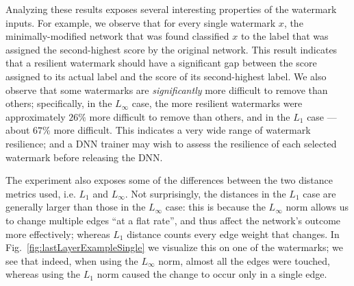 \documentclass{easychair}
\begin{document}
Analyzing these results exposes several interesting properties of the
watermark inputs. For example, we observe 
that for every single watermark $x$, the minimally-modified network that
was found classified $x$ to the label that was assigned the second-highest score
 by the original network. This result indicates
that a resilient watermark should have a
significant gap between the score assigned to its actual label and
the score of its second-highest label. We also observe that some
watermarks are \emph{significantly} more difficult to remove than
others; specifically, in the $L_\infty$ case, the more resilient
watermarks were approximately $26\%$ more difficult to remove than
others, and in the $L_1$ case --- about $67\%$ more
difficult.
This indicates a very wide range of watermark resilience; and
a DNN trainer may wish to assess the resilience of each selected
watermark before releasing the DNN.


The experiment also exposes some of the differences between the two
distance metrics used, i.e. $L_1$ and $L_\infty$. Not surprisingly,
the distances in the $L_1$ case are generally larger than those in the
$L_\infty$ case: this is because the $L_\infty$ norm allows us to
change multiple edges ``at a flat rate'', and thus affect the
network's outcome more effectively; whereas $L_1$ distance counts
every edge weight that changes. In
Fig.~\ref{fig:lastLayerExampleSingle} we visualize this on one
of the watermarks; we see that indeed, when using the $L_\infty$ norm,
almost all the edges were touched, whereas using the $L_1$ norm caused the
change to occur only in a single edge.
\end{document}
